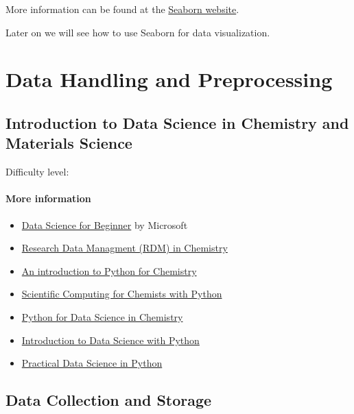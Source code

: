 \documentclass[
  letterpaper,
  DIV=11,
  numbers=noendperiod]{scrreprt}
\providecommand{\tightlist}{%
  \setlength{\itemsep}{0pt}\setlength{\parskip}{0pt}}\usepackage{longtable,booktabs,array}
\begin{document}
More information can be found at the
\href{https://seaborn.pydata.org/}{Seaborn website}.

Later on we will see how to use Seaborn for data visualization.

\part{Data Handling and Preprocessing}

\chapter{Introduction to Data Science in Chemistry and Materials
Science}\label{introduction-to-data-science-in-chemistry-and-materials-science}

Difficulty level: { }

\subsection*{More information}\label{more-information}

\begin{itemize}
\tightlist
\item
  \href{https://microsoft.github.io/Data-Science-For-Beginners/\#/}{Data
  Science for Beginner} by Microsoft
\item
  \href{https://knowledgebase.nfdi4chem.de/knowledge_base/}{Research
  Data Managment (RDM) in Chemistry}
\item
  \href{https://pythoninchemistry.org/intro_python_chemists/intro.html}{An
  introduction to Python for Chemistry}
\item
  \href{https://weisscharlesj.github.io/SciCompforChemists/notebooks/introduction/intro.html}{Scientific
  Computing for Chemists with Python}
\item
  \href{https://education.molssi.org/python-data-science-chemistry/intro.html}{Python
  for Data Science in Chemistry}
\item
  \href{https://pythondatabook.com/}{Introduction to Data Science with
  Python}
\item
  \href{https://www.practicaldatascience.org/intro.html}{Practical Data
  Science in Python}
\end{itemize}

\chapter*{Data Collection and
Storage}\label{data-collection-and-storage}
\end{document}
